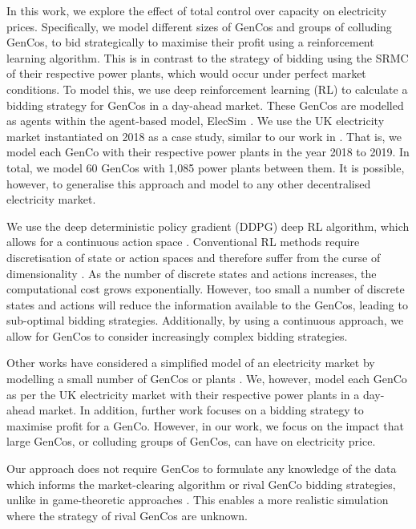 In this work, we explore the effect of total control over capacity on electricity prices. Specifically, we model different sizes of GenCos and groups of colluding GenCos, to bid strategically to maximise their profit using a reinforcement learning algorithm. This is in contrast to the strategy of bidding using the SRMC of their respective power plants, which would occur under perfect market conditions. To model this, we use deep reinforcement learning (RL) to calculate a bidding strategy for GenCos in a day-ahead market. These GenCos are modelled as agents within the agent-based model, ElecSim \cite{Kell, Kell2020}. We use the UK electricity market instantiated on 2018 as a case study, similar to our work in \cite{Kell2019a}. That is, we model each GenCo with their respective power plants in the year 2018 to 2019. In total, we model 60 GenCos with 1,085 power plants between them. It is possible, however, to generalise this approach and model to any other decentralised electricity market. 

We use the deep deterministic policy gradient (DDPG) deep RL algorithm, which allows for a continuous action space \cite{Hunt2016a}. Conventional RL methods require discretisation of state or action spaces and therefore suffer from the curse of dimensionality \cite{Ye2020a}. As the number of discrete states and actions increases, the computational cost grows exponentially. However, too small a number of discrete states and actions will reduce the information available to the GenCos, leading to sub-optimal bidding strategies. Additionally, by using a continuous approach, we allow for GenCos to consider increasingly complex bidding strategies. 

Other works have considered a simplified model of an electricity market by modelling a small number of GenCos or plants \cite{EsmaeiliAliabadi2017,Tellidou2007}. We, however, model each GenCo as per the UK electricity market with their respective power plants in a day-ahead market. In addition, further work focuses on a bidding strategy to maximise profit for a GenCo. However, in our work, we focus on the impact that large GenCos, or colluding groups of GenCos, can have on electricity price.


Our approach does not require GenCos to formulate any knowledge of the data which informs the market-clearing algorithm or rival GenCo bidding strategies, unlike in game-theoretic approaches \cite{Wang2011}. This enables a more realistic simulation where the strategy of rival GenCos are unknown.





